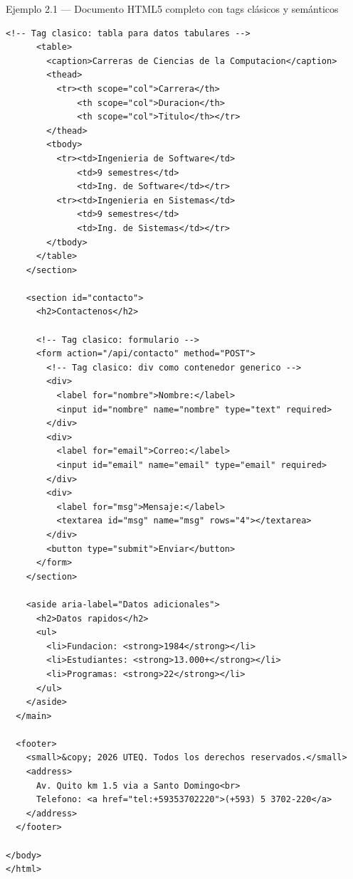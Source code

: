 \documentclass[11pt,a4paper,openany]{book}
\begin{document}
\begin{cajaejemplo}{Ejemplo 2.1 --- Documento HTML5 completo con tags clásicos y semánticos}
\begin{lstlisting}[style=html,caption={pagina-completa.html},label=lst:2.1]
      <!-- Tag clasico: tabla para datos tabulares -->
      <table>
        <caption>Carreras de Ciencias de la Computacion</caption>
        <thead>
          <tr><th scope="col">Carrera</th>
              <th scope="col">Duracion</th>
              <th scope="col">Titulo</th></tr>
        </thead>
        <tbody>
          <tr><td>Ingenieria de Software</td>
              <td>9 semestres</td>
              <td>Ing. de Software</td></tr>
          <tr><td>Ingenieria en Sistemas</td>
              <td>9 semestres</td>
              <td>Ing. de Sistemas</td></tr>
        </tbody>
      </table>
    </section>

    <section id="contacto">
      <h2>Contactenos</h2>

      <!-- Tag clasico: formulario -->
      <form action="/api/contacto" method="POST">
        <!-- Tag clasico: div como contenedor generico -->
        <div>
          <label for="nombre">Nombre:</label>
          <input id="nombre" name="nombre" type="text" required>
        </div>
        <div>
          <label for="email">Correo:</label>
          <input id="email" name="email" type="email" required>
        </div>
        <div>
          <label for="msg">Mensaje:</label>
          <textarea id="msg" name="msg" rows="4"></textarea>
        </div>
        <button type="submit">Enviar</button>
      </form>
    </section>

    <aside aria-label="Datos adicionales">
      <h2>Datos rapidos</h2>
      <ul>
        <li>Fundacion: <strong>1984</strong></li>
        <li>Estudiantes: <strong>13.000+</strong></li>
        <li>Programas: <strong>22</strong></li>
      </ul>
    </aside>
  </main>

  <footer>
    <small>&copy; 2026 UTEQ. Todos los derechos reservados.</small>
    <address>
      Av. Quito km 1.5 via a Santo Domingo<br>
      Telefono: <a href="tel:+59353702220">(+593) 5 3702-220</a>
    </address>
  </footer>

</body>
</html>
\end{lstlisting}


\end{cajaejemplo}
\end{document}
